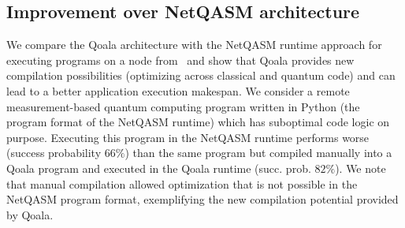 \subsection{Improvement over NetQASM architecture}
\label{sec:improvement_over_netqasm}
We compare the Qoala architecture with the NetQASM runtime approach for executing programs on a node from~\cite{dahlberg2022netqasm}
and show that Qoala provides new compilation possibilities (optimizing across classical and quantum code) and can lead to a better application execution makespan.
We consider a remote measurement-based quantum computing program written in Python (the program format of the NetQASM runtime) which has suboptimal code logic on purpose.
Executing this program in the NetQASM runtime performs worse (success probability $66\%$) than the same program but compiled manually into a Qoala program and executed in the Qoala runtime (succ. prob. $82\%$).
We note that manual compilation allowed optimization that is not possible in the NetQASM program format, exemplifying the new compilation potential provided by Qoala.

